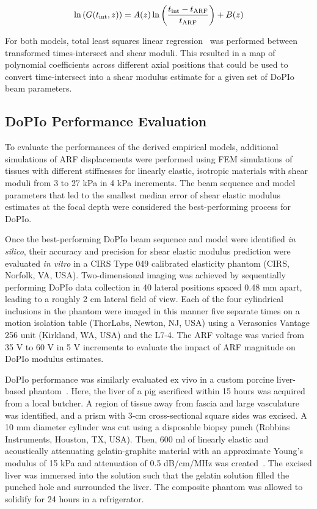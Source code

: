 \begin{equation}
\ln\left( G(t_{\textnormal{int}}, z) \right) = A(z) \ln\left( \frac{t_{\textnormal{int}} - t_{\textnormal{ARF}}}{t_{\textnormal{ARF}}} \right) + B(z) 
\label{eq:modelarb}
\end{equation}

For both models, total least squares linear regression~\cite{markovsky_Overview_2007} was performed between transformed times-intersect and shear moduli. This resulted in a map of polynomial coefficients across different axial positions that could be used to convert time-intersect into a shear modulus estimate for a given set of DoPIo beam parameters.

\subsection{DoPIo Performance Evaluation}

To evaluate the performances of the derived empirical models, additional simulations of ARF displacements were performed using FEM simulations of tissues with different stiffnesses for linearly elastic, isotropic materials with shear moduli from 3 to 27 kPa in 4 kPa increments. The beam sequence and model parameters that led to the smallest median error of shear elastic modulus estimates at the focal depth were considered the best-performing process for DoPIo.

Once the best-performing DoPIo beam sequence and model were identified \emph{in silico}, their accuracy and precision for shear elastic modulus prediction were evaluated \emph{in vitro} in a CIRS Type 049 calibrated elasticity phantom (CIRS, Norfolk, VA, USA). Two-dimensional imaging was achieved by sequentially performing DoPIo data collection in 40 lateral positions spaced 0.48 mm apart, leading to a roughly 2 cm lateral field of view. Each of the four cylindrical inclusions in the phantom were imaged in this manner five separate times on a motion isolation table (ThorLabs, Newton, NJ, USA) using a Verasonics Vantage 256 unit (Kirkland, WA, USA) and the L7-4. The ARF voltage was varied from 35 V to 60 V in 5 V increments to evaluate the impact of ARF magnitude on DoPIo modulus estimates. 

DoPIo performance was similarly evaluated ex vivo in a custom porcine liver-based phantom~\cite{hossain_Viscoelastic_2020}. Here, the liver of a pig sacrificed within 15 hours was acquired from a local butcher. A region of tissue away from fascia and large vasculature was identified, and a prism with 3-cm cross-sectional square sides was excised. A 10 mm diameter cylinder was cut using a disposable biopsy punch (Robbins Instruments, Houston, TX, USA). Then, 600 ml of linearly elastic and acoustically attenuating gelatin-graphite material with an approximate Young's modulus of 15 kPa and attenuation of 0.5 dB/cm/MHz was created~\cite{madsen_Tissue_1978,hall_Phantom_1997}. The excised liver was immersed into the solution such that the gelatin solution filled the punched hole and surrounded the liver. The composite phantom was allowed to solidify for 24 hours in a refrigerator. 

